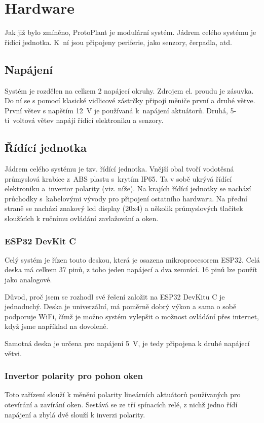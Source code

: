 \chapter{Hardware}
Jak již bylo zmíněno, ProtoPlant je modulární systém.
Jádrem celého systému je řídící jednotka. 
K~ní jsou připojeny periferie, jako senzory, čerpadla, atd.

\section{Napájení}
Systém je rozdělen na celkem 2 napájecí okruhy.
Zdrojem el. proudu je zásuvka.
Do ní se s pomocí klasické vidlicové zástrčky připojí měniče první a druhé větve.
První větev s napětím 12~V je používaná k~napájení aktuátorů.
Druhá, 5-ti~voltová větev napájí řídící elektroniku a senzory.


\section{Řídící jednotka}
Jádrem celého systému je tzv. řídící jednotka.
Vnější obal tvoří vodotěsná průmyslová krabice z~ABS plastu s~krytím IP65.
Ta v sobě ukrývá řídící elektroniku a~invertor polarity (viz. níže).
Na krajích řídící jednotky se nachází průchodky s~kabelovými vývody pro připojení ostatního hardwaru.
Na přední straně se nachází znakový lcd display (20x4) a několik průmyslových tlačítek sloužících k ručnímu ovládání zavlažování a oken.

\subsection{ESP32 DevKit C}
Celý systém je řízen touto deskou, která je osazena mikroprocesorem ESP32. 
Celá deska má celkem 37 pinů, z toho jeden napájecí a dva zemnící. 
16 pinů lze použít jako analogové.

Důvod, proč jsem se rozhodl své řešení založit na ESP32 DevKitu C je jednoduchý.
Deska je univerzální, má poměrně dobrý výkon a sama o sobě podporuje WiFi, čímž je možno systém vylepšit o možnost ovládání přes internet, když jsme například na dovolené. 

Samotná deska je určena pro napájení 5~V, je tedy připojena k druhé napájecí větvi.

\subsection{Invertor polarity pro pohon oken}
Toto zařízení slouží k měnění polarity lineárních aktuátorů používaných pro otevírání a zavírání oken.
Sestává se ze tří spínacích relé, z nichž jedno řídí napájení a zbylá dvě slouží k inverzi polarity.

